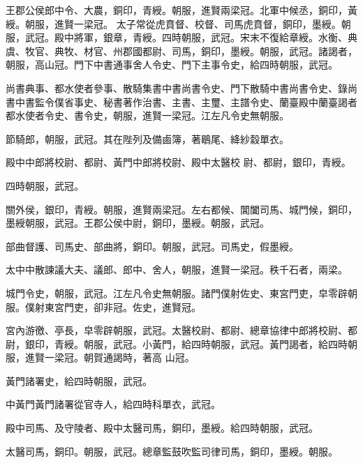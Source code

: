 \begin{pinyinscope}
 王郡公侯郎中令、大農，銅印，青綬。朝服，進賢兩梁冠。北軍中候丞，銅印，黃綬。朝服，進賢一梁冠。
 太子常從虎賁督、校督、司馬虎賁督，銅印，墨綬。朝服，武冠。殿中將軍，銀章，青綬。四時朝服，武冠。宋末不復給章綬。水衡、典虞、牧官、典牧、材官、州郡國都尉、司馬，銅印，墨綬。朝服，武冠。諸謁者，朝服，高山冠。門下中書通事舍人令史、門下主事令史，給四時朝服，武冠。



 尚書典事、都水使者參事、散騎集書中書尚書令史、門下散騎中書尚書令史、錄尚書中書監令僕省事史、秘書著作治書、主書、主璽、主譜令史、蘭臺殿中蘭臺謁者都水使者令史、書令史，朝服，進賢一梁冠。江左凡令史無朝服。



 節騎郎，朝服，武冠。其在陛列及備鹵簿，著鶡尾、絳紗縠單衣。



 殿中中郎將校尉、都尉、黃門中郎將校尉、殿中太醫校
 尉、都尉，銀印，青綬。



 四時朝服，武冠。



 關外侯，銀印，青綬。朝服，進賢兩梁冠。左右都候、閶闔司馬、城門候，銅印，墨綬朝服，武冠。王郡公侯中尉，銅印，墨綬。朝服，武冠。



 部曲督護、司馬史、部曲將，銅印。朝服，武冠。司馬史，假墨綬。



 太中中散諫議大夫、議郎、郎中、舍人，朝服，進賢一梁冠。秩千石者，兩梁。



 城門令史，朝服，武冠。江左凡令史無朝服。諸門僕射佐史、東宮門吏，皁零辟朝服。僕射東宮門吏，卻非冠。佐史，進賢冠。



 宮內游徼、亭長，皁零辟朝服，武冠。太醫校尉、都尉、總章協律中郎將校尉、都尉，銀印，青綬。朝服，武冠。小黃門，給四時朝服，武冠。黃門謁者，給四時朝服，進賢一梁冠。朝賀通謁時，著高
 山冠。



 黃門諸署史，給四時朝服，武冠。



 中黃門黃門諸署從官寺人，給四時科單衣，武冠。



 殿中司馬、及守陵者、殿中太醫司馬，銅印，墨綬。給四時朝服，武冠。



 太醫司馬，銅印。朝服，武冠。總章監鼓吹監司律司馬，銅印，墨綬。朝服。




\end{pinyinscope}
